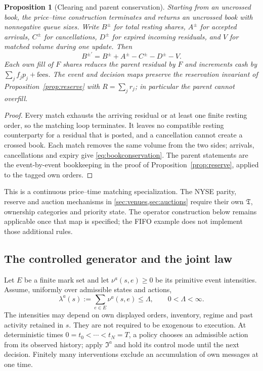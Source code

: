 \documentclass[11pt]{article}
\numberwithin{equation}{section}
\newtheorem{proposition}[theorem]{Proposition}
\theoremstyle{definition}
\theoremstyle{remark}
\theoremstyle{definition}
\begin{document}
\begin{proposition}[Clearing and parent conservation]\label{prop:taggedconservation}
Starting from an uncrossed book, the price--time construction terminates and
returns an uncrossed book with nonnegative queue sizes. Write $B^\pm$ for total
resting shares, $A^\pm$ for accepted arrivals, $C^\pm$ for cancellations,
$D^\pm$ for expired incoming residuals, and $V$ for matched volume during one
update. Then
\begin{equation}\label{eq:bookconservation}
  B^{\pm\prime}=B^\pm+A^\pm-C^\pm-D^\pm-V.
\end{equation}
Each own fill of $F$ shares reduces the parent residual by $F$ and increments
cash by $\sum_j f_jp_j+\text{fees}$. The event and decision maps preserve the
reservation invariant of Proposition~\ref{prop:reserve} with $R=\sum_j r_j$;
in particular the parent cannot overfill.
\end{proposition}

\begin{proof}
Every match exhausts the arriving residual or at least one finite resting
order, so the matching loop terminates. It leaves no compatible resting
counterparty for a residual that is posted, and a cancellation cannot create a
crossed book. Each match removes the same volume from the two sides; arrivals,
cancellations and expiry give \eqref{eq:bookconservation}. The parent statements are the
event-by-event bookkeeping in the proof of Proposition~\ref{prop:reserve},
applied to the tagged own orders.
\end{proof}


This is a continuous price--time matching specialization. The NYSE parity,
reserve and auction mechanisms in \cref{sec:venues,sec:auctions} require
their own $\mathfrak T$, ownership categories and priority state. The
operator construction below remains applicable once that map is specified;
the FIFO example does not implement those additional rules.

\subsection{The controlled generator and the joint law}

Let $E$ be a finite mark set and let $\nu^a(s,e)\ge0$ be its primitive
event intensities. Assume, uniformly over admissible states and actions,
\begin{equation}\label{eq:bookrates}
 \lambda^a(s):=\sum_{e\in E}\nu^a(s,e)\le\Lambda,
 \qquad 0<\Lambda<\infty.
\end{equation}
The intensities may depend on own displayed orders, inventory, regime and
past activity retained in $s$. They are not required to be exogenous to
execution. At deterministic times $0=t_0<\cdots<t_N=T$, a policy chooses
an admissible action from its observed history; apply $\mathfrak I^a$ and
hold its control mode until the next decision. Finitely many interventions
exclude an accumulation of own messages at one time.
\end{document}
